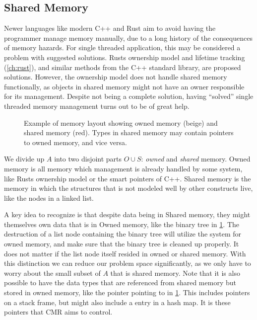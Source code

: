 \subsection{Shared Memory}

Newer languages like modern C++ and Rust aim to avoid having the programmer manage memory manually,
due to a long history of the consequences of memory hazards. For single threaded application, this
may be considered a problem with suggested solutions. Rusts ownership model and lifetime tracking
(\cref{ch:rust}), and similar methods from the C++ standard library, are proposed solutions.
However, the ownership model does not handle shared memory functionally, as objects in shared
memory might not have an owner responsible for its management. Despite not being a complete
solution, having ``solved'' single threaded memory management turns out to be of great help.

\begin{figure}[ht]
  \centering
  
  \caption{Example of memory layout showing owned memory (beige) and shared memory (red). Types in
  shared memory may contain pointers to owned memory, and vice versa.\label{fig:rust-shared-mem}}
\end{figure}

We divide up $A$ into two disjoint parts $O \cup S$: \emph{owned} and \emph{shared} memory.  Owned
memory is all memory which management is already handled by some system, like Rusts ownership model
or the smart pointers of C++. Shared memory is the memory in which the structures that is not
modeled well by other constructs live, like the nodes in a linked list.

A key idea to recognize is that despite data being in Shared memory, they might themselves own data
that is in Owned memory, like the binary tree in \cref{fig:rust-shared-mem}. The destruction of a
list node containing the binary tree will utilize the system for owned memory, and make sure that
the binary tree is cleaned up properly. It does not matter if the list node itself resided in owned
or shared memory.  With this distinction we can reduce our problem space significantly, as we only
have to worry about the small subset of $A$ that is shared memory.  Note that it is also possible
to have the data types that are referenced from shared memory but stored in owned memory, like the
pointer pointing to  in \cref{fig:rust-shared-mem}.  This includes pointers on a stack
frame, but might also include a entry in a hash map. It is these pointers that CMR aims to control.


